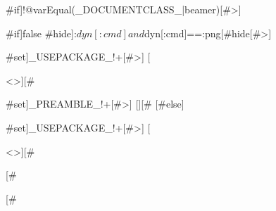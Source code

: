 {#if]!@{varEqual(_DOCUMENTCLASS_|beamer)}[#>]
  {#if]false {#hide]:{$dyn[:cmd] and $dyn[:cmd]==:png}[#hide}[#>]
    {#set]_USEPACKAGE_!+[#>] [\usepackage[noheadfoot,top=0in,bottom=0in,left=0in,right=0in,mag=1200]{geometry}<\n>][#}
    {#set]_PREAMBLE_!+[#>] [\pagestyle{empty}][#}
  [#else]
    {#set]_USEPACKAGE_!+[#>] [\usepackage[a4paper,pdftex=true]{geometry}<\n>][#}
  [#}
[#}